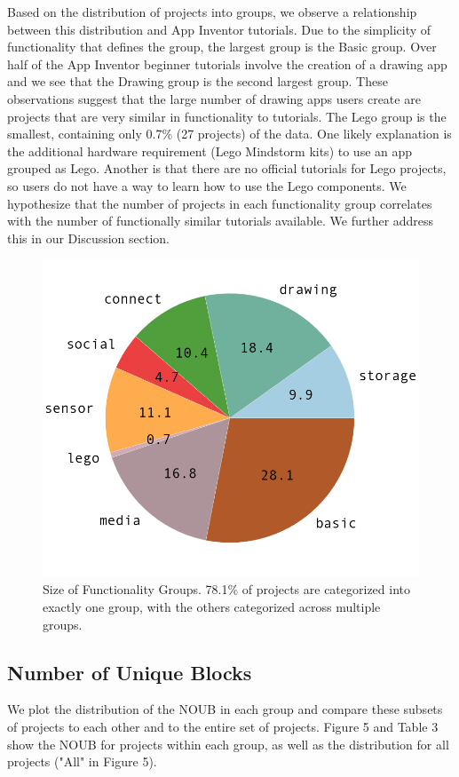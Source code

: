 \documentclass[conference]{IEEEtran}
\begin{document}
Based on the distribution of projects into groups, we observe a relationship between this distribution and App Inventor tutorials. Due to the simplicity of functionality that defines the group, the largest group is the Basic group. Over half of the App Inventor beginner tutorials involve the creation of a drawing app \cite{ai_tutorials} and we see that the Drawing group is the second largest group. These observations suggest that the large number of drawing apps users create are projects that are very similar in functionality to tutorials. The Lego group is the smallest, containing only 0.7\% (27 projects) of the data. One likely explanation is the additional hardware requirement (Lego Mindstorm kits) to use an app grouped as Lego. Another is that there are no official tutorials for Lego projects, so users do not have a way to learn how to use the Lego components. We hypothesize that the number of projects in each functionality group correlates with the number of functionally similar tutorials available. We further address this in our Discussion section.


\begin{figure}[h!]
	\centering
	\includegraphics[width=0.9\linewidth]{pie_group.png}
	\caption{Size of Functionality Groups. 78.1\% of projects are categorized into exactly one group, with the others categorized across multiple groups.}
	\label{DistributionOfGroups}
\end{figure}

\subsection{Number of Unique Blocks}
We plot the distribution of the NOUB in each group and compare these subsets of projects to each other and to the entire set of projects. Figure 5 and Table 3 show the NOUB for projects within each group, as well as the distribution for all projects ("All" in Figure 5). 
\end{document}

